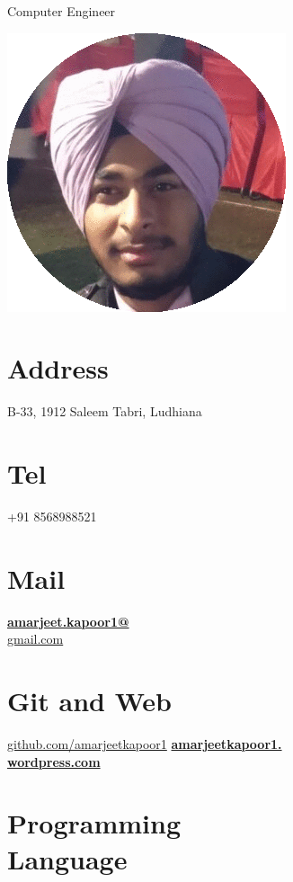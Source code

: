 \documentclass[]{friggeri-cv}
\begin{document}
      {Computer Engineer}
      

\begin{aside}
\includegraphics[scale=0.30]{amar.png}
  \section{Address}
    B-33, 1912 
    Saleem Tabri, Ludhiana
    ~
  \section{Tel}
    +91 8568988521
    ~
  \section{Mail}
    \href{mailto:amarjeet.kapoor1@gmail.com}{\textbf{amarjeet.kapoor1@}\\gmail.com}
    ~
  \section{Git and Web}
    \href{github.com/amarjeetkapoor1}{\small{github.com/amarjeetkapoor1}}
    \href{http://amarjeetkapoor1.wordpress.com}{\textbf{amarjeetkapoor1.\\wordpress.com}}
    ~
  \section{Programming \\ Language}
    ~

\end{aside}
\end{document}
